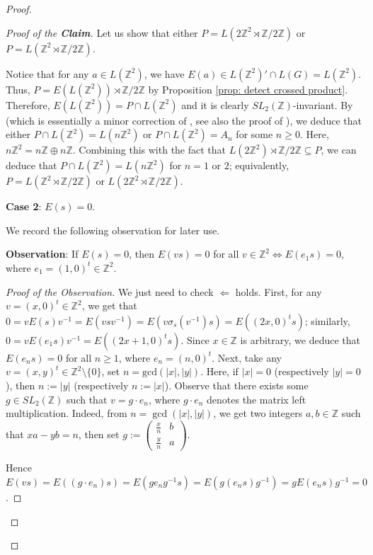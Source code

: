 \documentclass[12pt]{amsart}
\theoremstyle{definition}
\theoremstyle{remark}
\begin{document}
\begin{proof}
\begin{proof}[Proof of the \textbf{Claim}]
Let us show that either $P=L(2\mathbb{Z}^2\rtimes \mathbb{Z}/{2\mathbb{Z}})$ or $P=L(\mathbb{Z}^2\rtimes \mathbb{Z}/{2\mathbb{Z}})$.

Notice that for any $a\in L(\mathbb{Z}^2)$, we have $E(a)\in L(\mathbb{Z}^2)'\cap L(G)=L(\mathbb{Z}^2)$.
Thus, $P=E(L(\mathbb{Z}^2))\rtimes \mathbb{Z}/{2\mathbb{Z}}$ by Proposition \ref{prop: detect crossed product}. Therefore, $E(L(\mathbb{Z}^2))=P\cap L(\mathbb{Z}^2)$ and it is clearly $SL_2(\mathbb{Z})$-invariant. By 
\cite[Example 5.9]{wit} (which is essentially a minor correction of \cite[Theorem 2.3]{park}, see also the proof
of \cite[Lemma 3.5]{jiangskalski}), we deduce that either $P\cap L(\mathbb{Z}^2)=L(n\mathbb{Z}^2)$ or $P\cap L(\mathbb{Z}^2)=A_n$ for some $n\geq 0$. Here, $n\mathbb{Z}^2=n\mathbb{Z}\oplus n\mathbb{Z}$. Combining this with the fact that $L(2\mathbb{Z}^2)\rtimes \mathbb{Z}/{2\mathbb{Z}}\subseteq P$, we can deduce that $P\cap L(\mathbb{Z}^2)=L(n\mathbb{Z}^2)$ for $n=1$ or $2$; equivalently, $P=L(\mathbb{Z}^2\rtimes \mathbb{Z}/{2\mathbb{Z}})$ or $L(2\mathbb{Z}^2\rtimes \mathbb{Z}/{2\mathbb{Z}})$.

\textbf{Case 2}: $E(s)=0$.


We record the following observation for later use.

\textbf{Observation}: If $E(s)=0$, then $E(vs)=0$ for all $v\in\mathbb{Z}^2\Leftrightarrow E(e_1s)=0$, where $e_1=(1, 0)^t\in\mathbb{Z}^2$.

\begin{proof}[Proof of the Observation]
We just need to check $\Leftarrow$ holds. First, for any $v=(x, 0)^t\in\mathbb{Z}^2$, we get that $0=vE(s)v^{-1}=E(vsv^{-1})=E(v\sigma_s(v^{-1})s)=E((2x, 0)^ts)$; similarly, $0=vE(e_1s)v^{-1}=E((2x+1, 0)^ts)$. Since $x\in\mathbb{Z}$ is arbitrary, we deduce that $E(e_ns)=0$ for all $n\geq 1$, where $e_n=(n, 0)^t$. Next, take any $v=(x, y)^t\in\mathbb{Z}^2\setminus\{0\}$, set $n=\text{gcd}(|x|, |y|)$. Here, if $|x|=0$ (respectively $|y|=0$), then $n:=|y|$ (respectively $n:=|x|$). Observe that there exists some $g\in SL_2(\mathbb{Z})$ such that $v=g\cdot e_n$, where $g\cdot e_n$ denotes the matrix left multiplication. Indeed, from $n=\gcd(|x|, |y|)$, we get two integers $a, b\in\mathbb{Z}$ such that $xa-yb=n$, then set $g:=\begin{pmatrix}
\frac{x}{n}&b\\
\frac{y}{n}&a
\end{pmatrix}$.

Hence $E(vs)=E((g\cdot e_n)s)=E(ge_ng^{-1}s)=E(g(e_ns)g^{-1})=gE(e_ns)g^{-1}=0$.
\end{proof}


\end{proof}
\end{proof}
\end{document}
